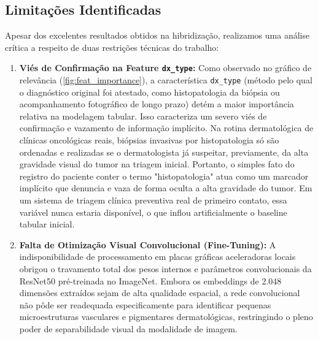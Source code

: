 \documentclass[10pt,twocolumn,letterpaper]{article}
\begin{document}
\subsection{Limitações Identificadas}
Apesar dos excelentes resultados obtidos na hibridização, realizamos uma análise crítica a respeito de duas restrições técnicas do trabalho:
\begin{enumerate}
    \item \textbf{Viés de Confirmação na Feature \texttt{dx\_type}:} Como observado no gráfico de relevância (\cref{fig:feat_importance}), a característica \texttt{dx\_type} (método pelo qual o diagnóstico original foi atestado, como histopatologia da biópsia ou acompanhamento fotográfico de longo prazo) detém a maior importância relativa na modelagem tabular. Isso caracteriza um severo viés de confirmação e vazamento de informação implícito. Na rotina dermatológica de clínicas oncológicas reais, biópsias invasivas por histopatologia só são ordenadas e realizadas se o dermatologista já suspeitar, previamente, da alta gravidade visual do tumor na triagem inicial. Portanto, o simples fato do registro do paciente conter o termo "histopatologia" atua como um marcador implícito que denuncia e vaza de forma oculta a alta gravidade do tumor. Em um sistema de triagem clínica preventiva real de primeiro contato, essa variável nunca estaria disponível, o que inflou artificialmente o baseline tabular inicial.
    \item \textbf{Falta de Otimização Visual Convolucional (Fine-Tuning):} A indisponibilidade de processamento em placas gráficas aceleradoras locais obrigou o travamento total dos pesos internos e parâmetros convolucionais da ResNet50 pré-treinada no ImageNet. Embora os embeddings de 2.048 dimensões extraídos sejam de alta qualidade espacial, a rede convolucional não pôde ser readequada especificamente para identificar pequenas microestruturas vasculares e pigmentares dermatológicas, restringindo o pleno poder de separabilidade visual da modalidade de imagem.
\end{enumerate}
\end{document}

